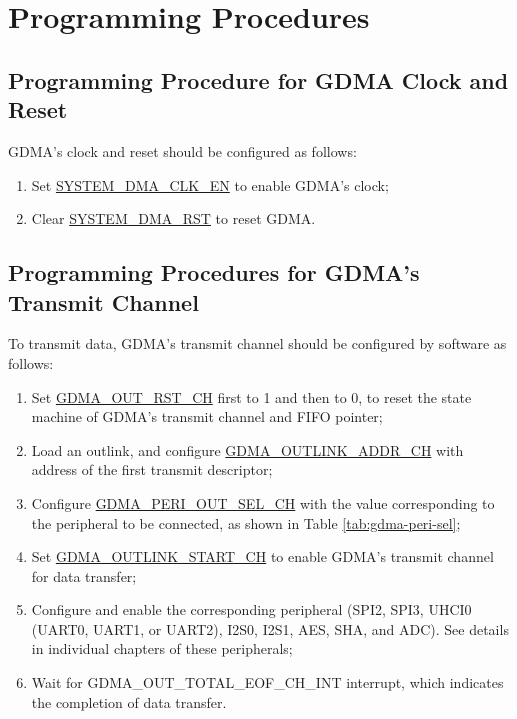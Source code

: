 \documentclass[main\_\_EN.tex]{subfiles}
\begin{document}
\section{Programming Procedures}

\subsection{Programming Procedure for GDMA Clock and Reset}

GDMA's clock and reset should be configured as follows:
\begin{enumerate}
    \item Set \hyperref[fielddesc:SYSTEMDMACLKEN]{SYSTEM\_DMA\_CLK\_EN} to enable GDMA's clock;
    \item Clear \hyperref[fielddesc:SYSTEMDMARST]{SYSTEM\_DMA\_RST} to reset GDMA.
\end{enumerate}

\subsection{Programming Procedures for GDMA's Transmit Channel}

To transmit data, GDMA's transmit channel should be configured by software as follows:
\begin{enumerate}
    \item Set \hyperref[fielddesc:DMAOUTRSTCHN]{GDMA\_OUT\_RST\_CH} first to 1 and then to 0, to reset the state machine of GDMA's transmit channel and FIFO pointer;
    \item Load an outlink, and configure \hyperref[fielddesc:DMAOUTLINKADDRCHN]{GDMA\_OUTLINK\_ADDR\_CH}  with address of the first transmit descriptor;
    \item Configure \hyperref[fielddesc:DMAPERIOUTSELCHN]{GDMA\_PERI\_OUT\_SEL\_CH} with the value corresponding to the peripheral to be connected, as shown in Table \ref{tab:gdma-peri-sel};
    \item Set \hyperref[fielddesc:DMAOUTLINKSTARTCHN]{GDMA\_OUTLINK\_START\_CH} to enable GDMA's transmit channel for data transfer;
    \item Configure and enable the corresponding peripheral (SPI2, SPI3, UHCI0 (UART0, UART1, or UART2), I2S0, I2S1, AES, SHA, and ADC). See details in individual chapters of these peripherals;
    \item Wait for GDMA\_OUT\_TOTAL\_EOF\_CH\_INT interrupt, which indicates the completion of data transfer.
\end{enumerate}
\end{document}
